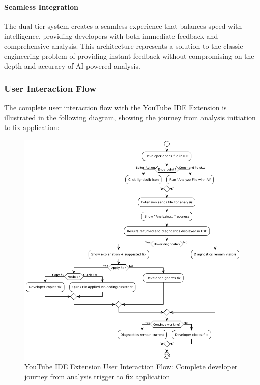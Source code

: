 \begin{spacing}{1.2}
\paragraph{Seamless Integration}
The dual-tier system creates a seamless experience that balances speed with intelligence, providing developers with both immediate feedback and comprehensive analysis. This architecture represents a solution to the classic engineering problem of providing instant feedback without compromising on the depth and accuracy of AI-powered analysis.

\subsubsection{User Interaction Flow}
The complete user interaction flow with the YouTube IDE Extension is illustrated in the following diagram, showing the journey from analysis initiation to fix application:

\begin{figure}[H]
\centering
\includegraphics[scale=0.65]{images/user_flow.png}
\caption{YouTube IDE Extension User Interaction Flow: Complete developer journey from analysis trigger to fix application}
\label{fig:user_interface_flow}
\end{figure}


\end{spacing}
